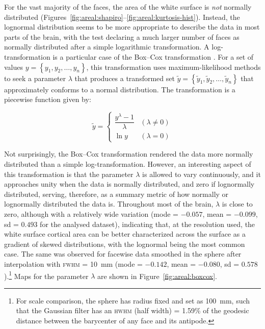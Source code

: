 For the vast majority of the faces, the area of the white surface is \emph{not} normally distributed (Figures~\ref{fig:areal:shapiro}--\ref{fig:areal:kurtosis-hist}). Instead, the lognormal distribution seems to be more appropriate to describe the data in most parts of the brain, with the test declaring a much larger number of faces as normally distributed after a simple logarithmic transformation. A log-transformation is a particular case of the Box--Cox transformation \citep{Box1964}. For a set of values $y=\left\{ y_1, y_2, \ldots , y_n \right\}$, this transformation uses maximum-likelihood methods to seek a parameter $\lambda$ that produces a transformed set $\tilde{y}=\left\{ \tilde{y}_1, \tilde{y}_2, \ldots , \tilde{y}_n \right\}$ that approximately conforms to a normal distribution. The transformation is a piecewise function given by:

\begin{equation}
\tilde{y} = \left\{ \begin{array}{ll}
\dfrac{y^{\lambda}-1}{\lambda} & (\lambda \neq 0) \\
\ln y & (\lambda = 0)
\end{array} \right.
\end{equation}

Not surprisingly, the Box--Cox transformation rendered the data more normally distributed than a simple log-transformation. However, an interesting aspect of this transformation is that the parameter $\lambda$ is allowed to vary continuously, and it approaches unity when the data is normally distributed, and zero if lognormally distributed, serving, therefore, as a summary metric of how normally or lognormally distributed the data is. Throughout most of the brain, $\lambda$ is close to zero, although with a relatively wide variation (mode = $-0.057$, mean = $-0.099$, sd = $0.493$ for the analysed dataset), indicating that, at the resolution used, the white surface cortical area can be better characterized across the surface as a gradient of skewed distributions, with the lognormal being the most common case. The same was observed for facewise data smoothed in the sphere after interpolation with \textsc{fwhm} = 10~mm (mode = $-0.142$, mean = $-0.080$, sd = $0.578$).\footnote{For scale comparison, the sphere has radius fixed and set as 100~mm, such that the Gaussian filter has an \textsc{hwhm} (half width) = 1.59\% of the geodesic distance between the barycenter of any face and its antipode.} Maps for the parameter $\lambda$ are shown in Figure~\ref{fig:areal:boxcox}.

